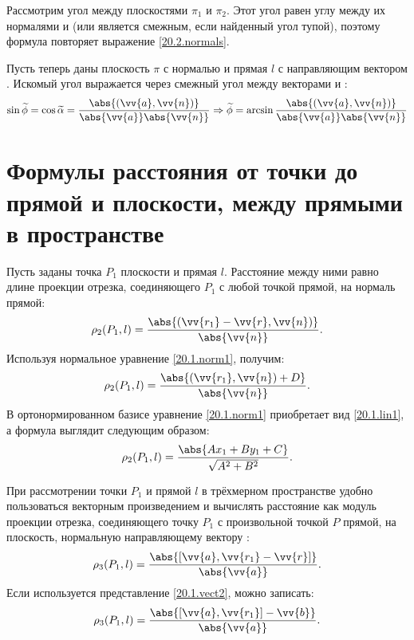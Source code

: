   Рассмотрим угол между плоскостями $\pi_1$ и $\pi_2$. Этот угол равен углу между их нормалями  и  (или является смежным, если найденный угол тупой), поэтому формула повторяет выражение \eqref{20.2.normals}.
  
  Пусть теперь даны плоскость $\pi$ с нормалью  и прямая $l$ с направляющим вектором . Искомый угол выражается через смежный угол между векторами  и :
  \begin{equation}
  \sin  \widetilde \phi = \cos  \widetilde \alpha = \dfrac{\abs{(\vv{a},\vv{n})}}{\abs{\vv{a}} \abs{\vv{n}}} \Rightarrow
  \widetilde \phi = \arcsin \dfrac{\abs{(\vv{a},\vv{n})}}{\abs{\vv{a}} \abs{\vv{n}}}
  \end{equation}
\vspace{1.5pt plus 0.75pt minus 0.75pt}


\section{Формулы расстояния от точки до прямой и плоскости, между прямыми в пространстве}
  Пусть заданы точка $P_1$ плоскости и прямая $l$. Расстояние между ними равно длине проекции отрезка, соединяющего $P_1$ с любой точкой прямой, на нормаль прямой:
  \begin{equation}\label{20.3.normals1}
  \rho_2 (P_1,l) = \dfrac{ \abs{(\vv{r_1}-\vv{r},\vv{n})} }{ \abs{\vv{n}} }.
  \end{equation}   
  Используя нормальное уравнение \eqref{20.1.norm1}, получим:
  \begin{equation}\label{20.3.normals2}
  \rho_2 (P_1,l) = \dfrac{\abs{(\vv{r_1},\vv{n})+D}}{\abs{\vv{n}}}.
  \end{equation}
  В ортонормированном базисе уравнение \eqref{20.1.norm1} приобретает вид \eqref{20.1.lin1}, а формула выглядит следующим образом:
  \begin{equation}
  \rho_2 (P_1,l) = \dfrac{\abs{Ax_1+By_1+C}}{\sqrt{A^2+B^2}}.
  \end{equation}
  
  При рассмотрении точки $P_1$ и прямой $l$ в трёхмерном пространстве удобно пользоваться векторным произведением и вычислять расстояние как модуль проекции отрезка, соединяющего точку $P_1$ с произвольной точкой $P$ прямой, на плоскость, нормальную направляющему вектору :
  \begin{equation}
  \rho_3 (P_1,l) = \dfrac{\abs{[\vv{a},\vv{r_1}-\vv{r}]}}{\abs{\vv{a}}}.
  \end{equation}
  Если используется представление \ref{20.1.vect2}, можно записать:
  \begin{equation}
  \rho_3 (P_1,l) = \dfrac{\abs{[\vv{a},\vv{r_1}]-\vv{b}}}{\abs{\vv{a}}}.
  \end{equation}

